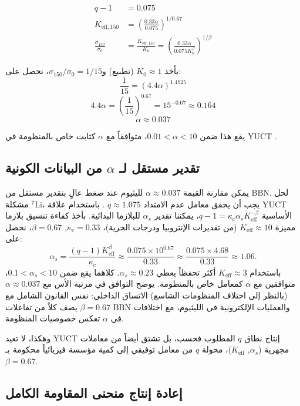 \documentclass[12pt,a4paper]{article}
\newcommand{\kappac}{\kappa_c}
\newcommand{\Ke}{K_{\mathrm{eff}}}
\newcommand{\alp}{\alpha}
\theoremstyle{remark}
\begin{document}
	\begin{align}
		q - 1 &= 0.075 \nonumber \\
		K_{\mathrm{eff},150} &= \left( \frac{0.33 \alp}{0.075} \right)^{1/0.67} \nonumber \\
		\frac{\sigma_{150}}{\sigma_0} &= \frac{K_{\mathrm{eff},150}}{K_0} = \left( \frac{0.33 \alp}{0.075 K_0^{\beta}} \right)^{1/\beta} \label{eq:calibration}
	\end{align}
	
	بأخذ \(K_0 \approx 1\) (تطبيع) و\(\sigma_{150}/\sigma_0 = 1/15\)، نحصل على:
	\[
	\frac{1}{15} = \left( 4.4 \alp \right)^{1.4925}
	\]
	\[
	4.4 \alp = \left( \frac{1}{15} \right)^{0.67} = 15^{-0.67} \approx 0.164
	\]
	\[
	\alp \approx 0.037
	\]
	
	يقع هذا ضمن \(0.01 < \alp < 10\)، متوافقاً مع \(\alp\) كثابت خاص بالمنظومة في YUCT \cite{appendixC}.
	
	\subsection{تقدير مستقل لـ \(\alp\) من البيانات الكونية}
	\label{subsec:alpha_cosmo}
	
	يمكن مقارنة القيمة \(\alp \approx 0.037\) لليثيوم عند ضغط عالٍ بتقدير مستقل من BBN. لحل مشكلة \(^7\)Li، يجب أن يحقق معامل عدم الامتداد \(q \approx 1.075\) \cite{bertulani2015}. باستخدام علاقة YUCT الأساسية \(q-1 = \kappac \alp_s \Ke^{-\beta}\)، يمكننا تقدير \(\alp_s\) للبلازما البدائية. بأخذ كفاءة تنسيق بلازما مميزة \(\Ke \approx 10\) (من تقديرات الإنتروبيا ودرجات الحرية)، \(\kappac = 0.33\), \(\beta = 0.67\)، نحصل على:
	\[
	\alp_s = \frac{(q-1)\Ke^{\beta}}{\kappac} \approx \frac{0.075 \times 10^{0.67}}{0.33} \approx \frac{0.075 \times 4.68}{0.33} \approx 1.06.
	\]
	باستخدام \(\Ke \approx 3\) أكثر تحفظاً يعطي \(\alp_s \approx 0.23\). كلاهما يقع ضمن \(0.1 < \alp_s < 10\)، متوافقين مع \(\alp\) كمعامل خاص بالمنظومة. يوضح التوافق في مرتبة الأس مع \(\alp \approx 0.037\) (بالنظر إلى اختلاف المنظومات الشاسع) الاتساق الداخلي: نفس القانون الشامل مع \(\beta = 0.67\) يصف كلاً من تفاعلات BBN والعمليات الإلكترونية في الليثيوم، مع اختلافات في \(\alp\) تعكس خصوصيات المنظومة.
	
	وهكذا، لا تعيد YUCT إنتاج نطاق \(q\) المطلوب فحسب، بل تشتق أيضاً من معاملات مجهرية (\(\alp_s\), \(\Ke\))، محولة \(q\) من معامل توفيقي إلى كمية مؤسسة فيزيائياً محكومة بـ \(\beta = 0.67\).
	
	\subsection{إعادة إنتاج منحنى المقاومة الكامل}
	
\end{document}
